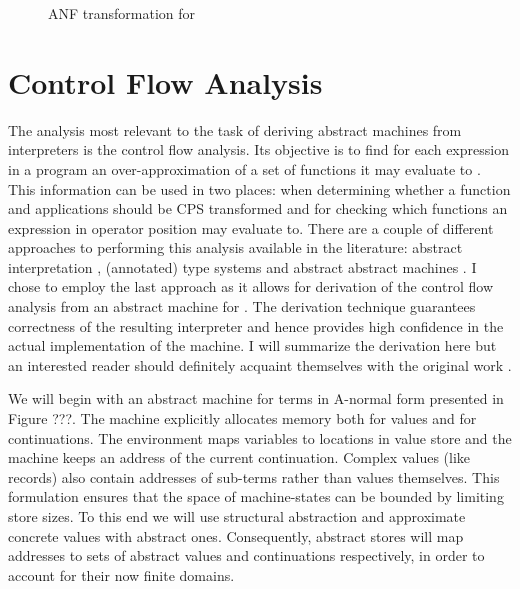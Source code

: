\begin{figure}
\begin{center}
\begin{tabular}{rll}
\end{tabular}
\endgroup
\end{center}
\caption{ANF transformation for \IDL{}}
\label{fig:transformer-anf}
\end{figure}


\section{Control Flow Analysis}\label{sec:transformer-cfa}
The analysis most relevant to the task of deriving abstract machines from interpreters is the control flow analysis.
Its objective is to find for each expression in a program an over-approximation of a set of functions it may evaluate to \cite{popa}.
This information can be used in two places: when determining whether a function and applications should be CPS transformed and for checking which functions an expression in operator position may evaluate to.
There are a couple of different approaches to performing this analysis available in the literature: abstract interpretation \cite{popa}, (annotated) type systems \cite{popa} and abstract abstract machines \cite{aam}.
I chose to employ the last approach as it allows for derivation of the control flow analysis from an abstract machine for \IDL{}.
The derivation technique guarantees correctness of the resulting interpreter and hence provides high confidence in the actual implementation of the machine.
I will summarize the derivation here but an interested reader should definitely acquaint themselves with the original work \cite{aam}.

We will begin with an abstract machine for terms in A-normal form presented in Figure ???.
The machine explicitly allocates memory both for values and for continuations.
The environment maps variables to locations in value store and the machine keeps an address of the current continuation.
Complex values (like records) also contain addresses of sub-terms rather than values themselves.
This formulation ensures that the space of machine-states can be bounded by limiting store sizes.
To this end we will use structural abstraction and approximate concrete values with abstract ones.
Consequently, abstract stores will map addresses to sets of abstract values and continuations respectively, in order to account for their now finite domains.


